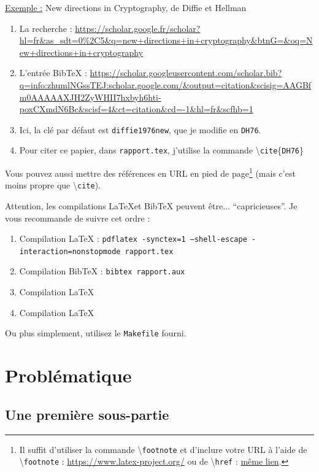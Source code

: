 \documentclass[a4paper, 12pt]{article}
\begin{document}
\underline{Exemple :} New directions in Cryptography, de Diffie et Hellman

\begin{enumerate}
\item La recherche : \url{https://scholar.google.fr/scholar?hl=fr&as_sdt=0%2C5&q=new+directions+in+cryptography&btnG=&oq=New+directions+in+cryptography}
\item L'entrée BibTeX : \url{https://scholar.googleusercontent.com/scholar.bib?q=info:zhumlNGssTEJ:scholar.google.com/&output=citation&scisig=AAGBfm0AAAAAXJH2ZyWHII7hxbyh6hti-poxCXmdN6Bc&scisf=4&ct=citation&cd=-1&hl=fr&scfhb=1}
\item Ici, la clé par défaut est \texttt{diffie1976new}, que je modifie en \texttt{DH76}. 
\item Pour citer ce papier, dans \texttt{rapport.tex}, j'utilise la commande \textbackslash\texttt{cite}\{\texttt{DH76}\}
\end{enumerate}



Vous pouvez aussi mettre des références en URL en pied de page\footnote{Il suffit d'utiliser la commande \textbackslash\texttt{footnote} et d'inclure votre URL à l'aide de \textbackslash\texttt{footnote} : \url{https://www.latex-project.org/} ou de \textbackslash\texttt{href} : \href{https://www.latex-project.org/}{même lien}.} (mais c'est moins propre que \textbackslash\texttt{cite}).
 

Attention, les compilations \LaTeX et BibTeX peuvent être... ``capricieuses''. Je vous recommande de suivre cet ordre :
\begin{enumerate}
\item Compilation \LaTeX{} : \texttt{pdflatex -synctex=1 --shell-escape -interaction=nonstopmode rapport.tex}
\item Compilation BibTeX : \texttt{bibtex rapport.aux}
\item Compilation \LaTeX{}
\item Compilation \LaTeX{}
\end{enumerate}
Ou plus simplement, utilisez le \texttt{Makefile} fourni.

\clearpage 
\section{Problématique}

\subsection{Une première sous-partie}
\end{document}
